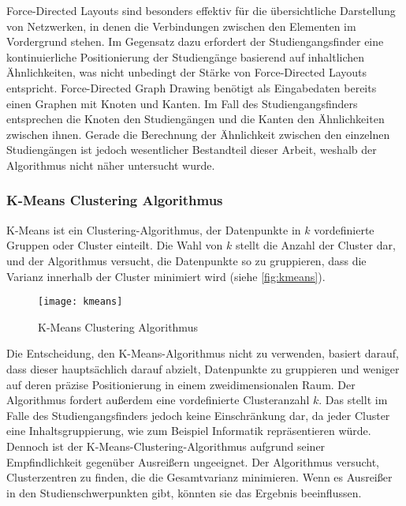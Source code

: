 Force-Directed Layouts sind besonders effektiv für die übersichtliche Darstellung von Netzwerken, in denen die Verbindungen zwischen den Elementen im Vordergrund stehen. \parencite{schonfeld_fruchtermanreingold_2019} Im Gegensatz dazu erfordert der Studiengangsfinder eine kontinuierliche Positionierung der Studiengänge basierend auf inhaltlichen Ähnlichkeiten, was nicht unbedingt der Stärke von Force-Directed Layouts entspricht. Force-Directed Graph Drawing benötigt als Eingabedaten bereits einen Graphen mit Knoten und Kanten. Im Fall des Studiengangsfinders entsprechen die Knoten den Studiengängen und die Kanten den Ähnlichkeiten zwischen ihnen. Gerade die Berechnung der Ähnlichkeit zwischen den einzelnen Studiengängen ist jedoch wesentlicher Bestandteil dieser Arbeit, weshalb der Algorithmus nicht näher untersucht wurde.

\subsubsection{K-Means Clustering Algorithmus}
K-Means ist ein Clustering-Algorithmus, der Datenpunkte in $k$ vordefinierte
Gruppen oder Cluster einteilt. Die Wahl von $k$ stellt die Anzahl der Cluster dar,
und der Algorithmus versucht, die Datenpunkte so zu gruppieren, dass die Varianz
innerhalb der Cluster minimiert wird (siehe \autoref{fig:kmeans}).
\parencite{jeffares_k-means_2019}

\begin{figure}[H]
    \centering
    \texttt{[image: kmeans]}
    \caption{K-Means Clustering Algorithmus}
    \label{fig:kmeans}
\end{figure}

Die Entscheidung, den K-Means-Algorithmus nicht zu verwenden, basiert darauf, dass dieser hauptsächlich darauf abzielt, Datenpunkte zu gruppieren und weniger auf deren präzise Positionierung in einem zweidimensionalen Raum. Der Algorithmus fordert außerdem eine vordefinierte Clusteranzahl $k$. Das stellt im Falle des Studiengangsfinders jedoch keine Einschränkung dar, da jeder Cluster eine Inhaltsgruppierung, wie zum Beispiel \glqq Informatik\grqq{} repräsentieren würde. Dennoch ist der K-Means-Clustering-Algorithmus aufgrund seiner Empfindlichkeit gegenüber Ausreißern ungeeignet. Der Algorithmus versucht, Clusterzentren zu finden, die die Gesamtvarianz minimieren. Wenn es Ausreißer in den Studienschwerpunkten gibt, könnten sie das Ergebnis beeinflussen. \parencite{roth_demonstration_2023}

